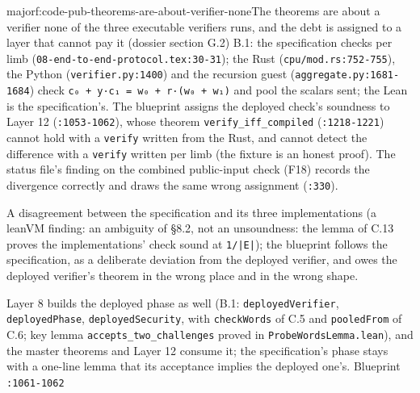 \begin{finding}{major}{f:code-pub-theorems-are-about-verifier-none}{The theorems are about a verifier none of the three executable verifiers runs, and the debt is assigned to a layer that cannot pay it (dossier section G.2)}
B.1: the specification checks per limb (\texttt{0\allowbreak{}8\allowbreak{}-{}\allowbreak{}e\allowbreak{}n\allowbreak{}d\allowbreak{}-{}\allowbreak{}t\allowbreak{}o\allowbreak{}-{}\allowbreak{}e\allowbreak{}n\allowbreak{}d\allowbreak{}-{}\allowbreak{}p\allowbreak{}r\allowbreak{}o\allowbreak{}t\allowbreak{}o\allowbreak{}c\allowbreak{}o\allowbreak{}l\allowbreak{}.\allowbreak{}t\allowbreak{}e\allowbreak{}x\allowbreak{}:\allowbreak{}3\allowbreak{}0\allowbreak{}-{}\allowbreak{}3\allowbreak{}1}); the Rust (\texttt{cpu/\allowbreak{}mod.\allowbreak{}rs:752-{}755}), the Python (\texttt{verifier.\allowbreak{}py:1400}) and the recursion guest (\texttt{aggregate.\allowbreak{}py:1681-{}1684}) check \texttt{c₀ + y·c₁ = w₀ + r·(\allowbreak{}w₀ + w₁)} and pool the scalars sent; the Lean is the specification's. The blueprint assigns the deployed check's soundness to Layer 12 (\texttt{:1053-{}1062}), whose theorem \texttt{verify\_\allowbreak{}iff\_\allowbreak{}compiled} (\texttt{:1218-{}1221}) cannot hold with a \texttt{verify} written from the Rust, and cannot detect the difference with a \texttt{verify} written per limb (the fixture is an honest proof). The status file's finding on the combined public-input check (F18) records the divergence correctly and draws the same wrong assignment (\texttt{:330}).

A disagreement between the specification and its three implementations (a leanVM finding: an ambiguity of §8.2, not an unsoundness: the lemma of C.13 proves the implementations' check sound at \texttt{1/\allowbreak{}|E|}); the blueprint follows the specification, as a deliberate deviation from the deployed verifier, and owes the deployed verifier's theorem in the wrong place and in the wrong shape.

Layer 8 builds the deployed phase as well (B.1: \texttt{deployedVerifier}, \texttt{deployedPhase}, \texttt{deployedSecurity}, with \texttt{checkWords} of C.5 and \texttt{pooledFrom} of C.6; key lemma \texttt{accepts\_\allowbreak{}two\_\allowbreak{}challenges} proved in \texttt{ProbeWordsLemma.\allowbreak{}lean}), and the master theorems and Layer 12 consume it; the specification's phase stays with a one-line lemma that its acceptance implies the deployed one's. Blueprint \texttt{:1061-{}1062}


\end{finding}
